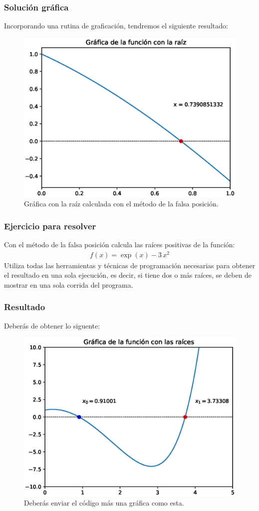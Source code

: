 \begin{frame}
\frametitle{Solución gráfica}
Incorporando una rutina de graficación, tendremos el siguiente resultado:
\begin{figure}[h!]
	\centering
	\includegraphics[scale=0.4]{Imagenes/raices_falsaposicion_03.eps}
	\caption{Gráfica con la raíz calculada con el método de la falsa posición.}
\end{figure}
\end{frame}
\begin{frame}
\frametitle{Ejercicio para resolver}
Con el método de la falsa posición calcula las raíces positivas de la función:
\begin{align*}
f(x) = \exp(x) - 3 \, x^{2}
\end{align*}
Utiliza todas las herramientas y técnicas de programación necesarias para obtener el resultado en una sola ejecución, es decir, si tiene dos o más raíces, se deben de mostrar en una sola corrida del programa.
\end{frame}
\begin{frame}
\frametitle{Resultado}
Deberás de obtener lo siguente:
\begin{figure}[h!]
	\centering
	\includegraphics[scale=0.4]{Imagenes/raices_falsaposicion_04.eps}
	\caption{Deberás enviar el código más una gráfica como esta.}
\end{figure}
\end{frame}
